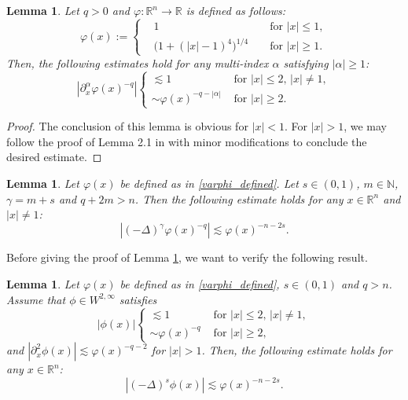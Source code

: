 \documentclass[11pt,reqno]{amsart}
\numberwithin{equation}{section}
\newtheorem{lemma}[theorem]{Lemma}
\begin{document}
\begin{lemma}\label{lem_Laplace_integer}
Let $q>0$ and $\varphi:\mathbb{R}^n\to \mathbb{R}$ is defined as follows:
\begin{equation}\label{varphi_defined}
\varphi(x):=\left\{
\begin{aligned}
&1&&\text{ for }|x|\leq 1,\\
&\big(1+(|x|-1)^{4}\big)^{1/4}&&\text{ for }|x|\geq 1.
\end{aligned}
\right.
\end{equation}
Then, the following estimates hold for any multi-index $\alpha$ satisfying $|\alpha|\geq 1$:
\[
\left|\partial^\alpha_x\varphi(x)^{-q}\right|
\begin{cases}
    \lesssim 1 &\text{ for }|x|\leq 2,\,|x|\neq 1,\\
    \sim \varphi(x)^{-q-|\alpha|} &\text{ for }|x|\geq 2.
\end{cases}
\]
\end{lemma}

\begin{proof}
The conclusion of this lemma is obvious for $|x|<1$. For $|x|>1$, we may follow the proof of Lemma 2.1 in \cite{Anhblowup} with minor modifications to conclude the desired estimate. 
\end{proof}

\begin{lemma}\label{lem_Laplace_fractional}
    Let $\varphi(x)$ be defined as in \eqref{varphi_defined}. Let $s\in (0,1)$, $m\in \mathbb{N}$, $\gamma=m+s$ and $q+2m>n$. Then the following estimate holds for any $x\in \mathbb{R}^n$ and $|x|\neq 1$:
    \[
    |(-\Delta)^{\gamma}\varphi(x)^{-q}|\lesssim \varphi(x)^{-n-2s}.
    \]
\end{lemma}

Before giving the proof of Lemma \ref{lem_Laplace_fractional}, we want to verify the following result.

\begin{lemma}\label{lem_Laplace_(0,1)}
Let $\varphi(x)$ be defined as in \eqref{varphi_defined}, $s \in (0,1)$ and $q>n$. Assume that $\phi\in W^{2,\infty}$ satisfies 
\[
|\phi(x)|
\begin{cases}
    \lesssim 1 &\text{ for }|x|\leq 2,\,|x|\neq 1,\\
    \sim \varphi(x)^{-q} &\text{ for }|x|\geq 2,
\end{cases}
\]
and $\left|\partial^2_x\phi(x)\right|\lesssim \varphi(x)^{-q-2}$ for $|x|>1$. Then, the following estimate holds for any $x\in \mathbb{R}^n$:
\begin{equation}\label{10}
\left|(-\Delta)^s\phi(x)\right|\lesssim \varphi(x)^{-n-2s}.
\end{equation}
\end{lemma}
\end{document}
